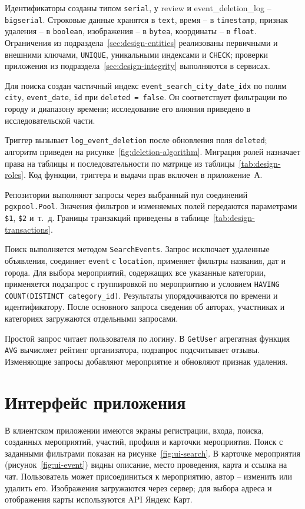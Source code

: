 Идентификаторы созданы типом \texttt{serial}, у review и event\_deletion\_log -- \texttt{bigserial}. Строковые данные хранятся в \texttt{text}, время -- в \texttt{timestamp}, признак удаления -- в \texttt{boolean}, изображения -- в \texttt{bytea}, координаты -- в \texttt{float}. Ограничения из подраздела~\ref{sec:design-entities} реализованы первичными и внешними ключами, \texttt{UNIQUE}, уникальными индексами и \texttt{CHECK}; проверки приложения из подраздела~\ref{sec:design-integrity} выполняются в сервисах.

Для поиска создан частичный индекс \texttt{event\_search\_city\_date\_idx} по полям \texttt{city}, \texttt{event\_date}, \texttt{id} при \texttt{deleted = false}. Он соответствует фильтрации по городу и диапазону времени; исследование его влияния приведено в исследовательской части.

Триггер вызывает \texttt{log\_event\_deletion} после обновления поля \texttt{deleted}; алгоритм приведен на рисунке~\ref{fig:deletion-algorithm}. Миграция ролей назначает права на таблицы и последовательности по матрице из таблицы~\ref{tab:design-roles}. Код функции, триггера и выдачи прав включен в приложение~А.

Репозитории выполняют запросы через выбранный пул соединений \texttt{pgxpool.Pool}. Значения фильтров и изменяемых полей передаются параметрами \texttt{\$1}, \texttt{\$2} и~т.~д. Границы транзакций приведены в таблице~\ref{tab:design-transactions}.

Поиск выполняется методом \texttt{SearchEvents}. Запрос исключает удаленные объявления, соединяет \texttt{event} с \texttt{location}, применяет фильтры названия, дат и города. Для выбора мероприятий, содержащих все указанные категории, применяется подзапрос с группировкой по мероприятию и условием \texttt{HAVING COUNT(DISTINCT category\_id)}. Результаты упорядочиваются по времени и идентификатору. После основного запроса сведения об авторах, участниках и категориях загружаются отдельными запросами.

Простой запрос читает пользователя по логину. В \texttt{GetUser} агрегатная функция \texttt{AVG} вычисляет рейтинг организатора, подзапрос подсчитывает отзывы. Изменяющие запросы добавляют мероприятие и обновляют признак удаления.

\section{Интерфейс приложения}

В клиентском приложении имеются экраны регистрации, входа, поиска, созданных мероприятий, участий, профиля и карточки мероприятия. Поиск с заданными фильтрами показан на рисунке~\ref{fig:ui-search}. В карточке мероприятия (рисунок~\ref{fig:ui-event}) видны описание, место проведения, карта и ссылка на чат. Пользователь может присоединиться к мероприятию, автор -- изменить или удалить его. Изображения загружаются через сервер; для выбора адреса и отображения карты используются API Яндекс Карт.

